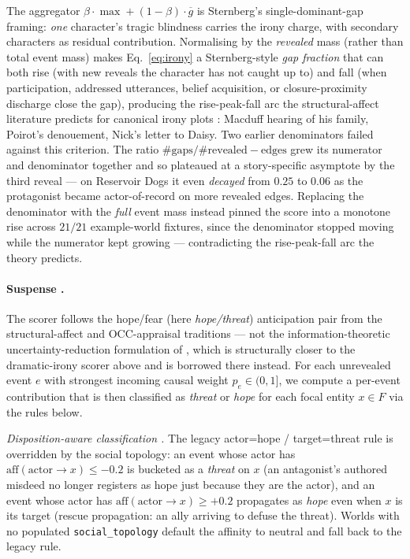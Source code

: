 \documentclass[11pt]{article}
\begin{document}
The aggregator $\beta \cdot \max + (1-\beta) \cdot \overline g$
is Sternberg's single-dominant-gap framing: \emph{one}
character's tragic blindness carries the irony charge, with
secondary characters as residual contribution. Normalising by
the \emph{revealed} mass (rather than total event mass) makes
Eq.~\ref{eq:irony} a Sternberg-style \emph{gap fraction} that
can both rise (with new reveals the character has not caught up
to) and fall (when participation, addressed utterances, belief
acquisition, or closure-proximity discharge close the gap),
producing the rise-peak-fall arc the structural-affect
literature predicts for canonical irony plots
\citep{booth1974irony,muecke1969compass}: Macduff hearing of
his family, Poirot's denouement, Nick's letter to Daisy. Two
earlier denominators failed against this criterion. The ratio
$\#\mathrm{gaps} / \#\mathrm{revealed{-}edges}$ grew its numerator
and denominator together and so plateaued at a story-specific
asymptote by the third reveal --- on Reservoir Dogs it even
\emph{decayed} from $0.25$ to $0.06$ as the protagonist became
actor-of-record on more revealed edges. Replacing the
denominator with the \emph{full} event mass instead pinned the
score into a monotone rise across $21/21$ example-world
fixtures, since the denominator stopped moving while the
numerator kept growing --- contradicting the rise-peak-fall arc
the theory predicts.

\paragraph{Suspense
\citep{brewer1982stories,comisky1982suspense,ortony1988occ,
zillmann1996suspense,lazarus1991emotion,cheong2015suspenser,elyfrankel2015suspense}.} The scorer follows
the hope/fear (here \emph{hope/threat}) anticipation pair from the
structural-affect and OCC-appraisal traditions --- not the
information-theoretic uncertainty-reduction formulation of
\citet{wilmot2020suspense}, which is structurally closer to the
dramatic-irony scorer above and is borrowed there instead. For each
unrevealed event $e$ with strongest incoming causal weight
$p_e \in (0, 1]$, we compute a per-event contribution that is then
classified as \emph{threat} or \emph{hope} for each focal entity
$x \in F$ via the rules below.

\emph{Disposition-aware classification \citep{zillmann1996suspense}.}
The legacy actor=hope / target=threat rule is overridden by the
social topology: an event whose actor has
$\mathrm{aff}(\mathrm{actor} \to x) \le -0.2$ is bucketed as a
\emph{threat} on $x$ (an antagonist's authored misdeed no longer
registers as hope just because they are the actor), and an event
whose actor has $\mathrm{aff}(\mathrm{actor} \to x) \ge +0.2$
propagates as \emph{hope} even when $x$ is its target (rescue
propagation: an ally arriving to defuse the threat). Worlds with
no populated \texttt{social\_topology} default the affinity to
neutral and fall back to the legacy rule.
\end{document}
